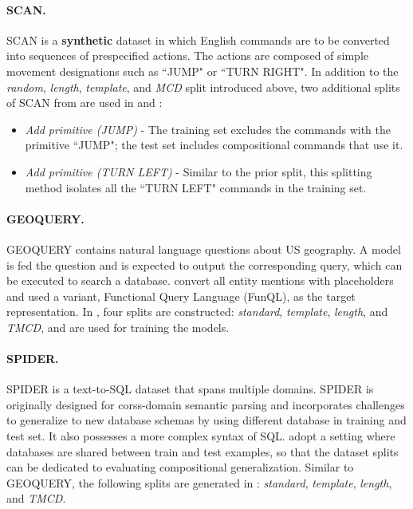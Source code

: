 \paragraph{SCAN.} SCAN is a \textbf{synthetic} dataset in which English commands are to be converted into sequences of prespecified actions. 
The actions are composed of simple movement designations such as ``JUMP" or ``TURN RIGHT". 
In addition to the \textit{random}, \textit{length}, \textit{template}, and \textit{MCD} split introduced above, two additional splits of SCAN from \cite{lake2018generalization} are used in \cite{shaw-etal-2021-compositional} and \cite{kim2021sequencetosequence}: 
\begin{itemize}[noitemsep,topsep=1pt,parsep=0.8pt,partopsep=0pt]
\item \textit{Add primitive (JUMP)} - The training set excludes the commands with the primitive ``JUMP"; the test set includes compositional commands that use it.
\item \textit{Add primitive (TURN LEFT)} - Similar to the prior split, this splitting method isolates all the ``TURN LEFT" commands in the training set.
\end{itemize}

\vspace{-3mm}
\paragraph{GEOQUERY.} GEOQUERY \citep{tang2001using, zelle1996learning} contains natural language questions about US geography. 
A model is fed the question and is expected to output the corresponding query, which can be executed to search a database.
\cite{shaw-etal-2021-compositional} convert all entity mentions with placeholders and used a variant, Functional Query Language (FunQL), as the target representation. In \cite{shaw-etal-2021-compositional}, four splits are constructed: \textit{standard}, \textit{template}, \textit{length}, and \textit{TMCD}, and are used for training the models.

\vspace{-3mm}
\paragraph{SPIDER.} SPIDER is a text-to-SQL dataset that spans multiple domains. SPIDER is originally designed for corss-domain semantic parsing and incorporates challenges to generalize to new database schemas by using different database in training and test set. It also possesses a more complex syntax of SQL. 
\cite{shaw-etal-2021-compositional} adopt a setting where databases are shared between train and test examples, so that the dataset splits can be dedicated to evaluating compositional generalization. Similar to GEOQUERY, the following splits are generated in \cite{shaw-etal-2021-compositional}: \textit{standard}, \textit{template}, \textit{length}, and \textit{TMCD}.

